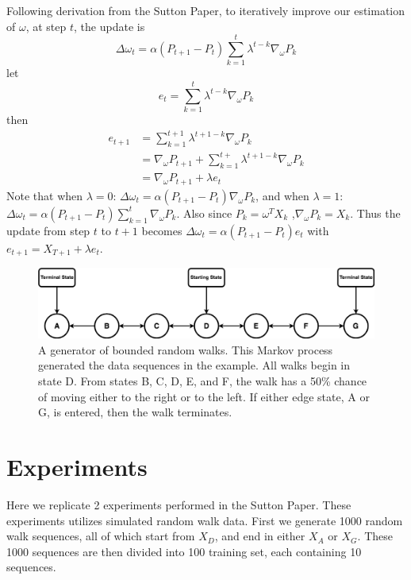 \documentclass[10pt]{article}
\begin{document}
Following derivation from the Sutton Paper, to iteratively improve our estimation of $\omega$, at step $t$, the update is 
$$\Delta\omega_t=\alpha(P_{t+1}-P_t)\sum_{k=1}^t\lambda^{t-k}\nabla_\omega P_k$$
let
$$e_t=\sum_{k=1}^t\lambda^{t-k}\nabla_\omega P_k$$
then
$$
\begin{aligned}
e_{t+1}&=\sum_{k=1}^{t+1}\lambda^{t+1-k}\nabla_\omega P_k \\
&=\nabla_\omega P_{t+1}+\sum_{k=1}^{t+}\lambda^{t+1-k}\nabla_\omega P_k \\
&=\nabla_\omega P_{t+1}+\lambda e_t
\end{aligned}
$$
Note that when $\lambda=0$: $\Delta\omega_t=\alpha(P_{t+1}-P_t)\nabla_\omega P_k$, and when $\lambda=1$: $\Delta\omega_t=\alpha(P_{t+1}-P_t)\sum_{k=1}^t\nabla_\omega P_k$. Also since $P_k=\omega^TX_k$ ,$\nabla_\omega P_k=X_k$. Thus the update from step $t$ to $t+1$ becomes $\Delta\omega_t=\alpha(P_{t+1}-P_t)e_t$ with $e_{t+1}=X_{T+1}+\lambda e_t$.



\begin{figure}[h!]
  \centering
  \includegraphics[width=\linewidth]{../problem/randomwalk.png}
    \caption{A generator of bounded random walks. This Markov process generated the data sequences in the example. All walks begin in state D. From states B, C, D, E, and F, the walk has a 50\% chance of moving either to the right or to the left. If either edge state, A or G, is entered, then the walk terminates.}
  \label{fig:fig2}
\end{figure}


\section{Experiments} \label{experiments}
Here we replicate 2 experiments performed in the Sutton Paper. These experiments utilizes simulated random walk data. First we generate 1000 random walk sequences, all of which start from $X_D$, and end in either $X_A$ or $X_G$. These 1000 sequences are then divided into 100 training set, each containing 10 sequences.

\par
\end{document}
